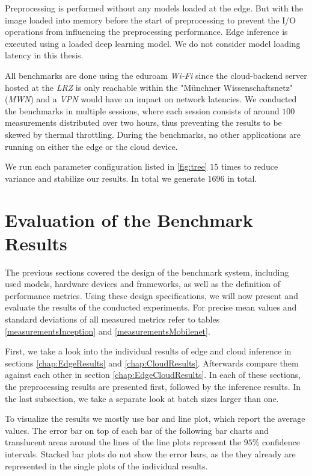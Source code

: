 Preprocessing is performed without any models loaded at the edge. But with the image loaded into memory before the start of preprocessing to prevent the I/O operations from influencing the preprocessing performance.
Edge inference is executed using a loaded deep learning model. 
We do not consider model loading latency in this thesis.

All benchmarks are done using the eduroam \emph{Wi‑Fi} since the cloud-backend server hosted at the \emph{LRZ} is only reachable within the "Münchner Wissenschaftsnetz" (\emph{MWN}) and a \emph{VPN} would have an impact on network latencies.
We conducted the benchmarks in multiple sessions, where each session consists of around  $100$ measurements distributed over two hours, thus preventing the results to be skewed by thermal throttling.
During the benchmarks, no other applications are running on either the edge or the cloud device.

We run each parameter configuration listed in \ref{fig:tree} $15$ times to reduce variance and stabilize our results. In total we generate $1696$ in total.
\section{Evaluation of the Benchmark Results}
\label{chap:Evaluation}
The previous sections covered the design of the benchmark system, including used models, hardware devices and frameworks, as well as the definition of performance metrics. Using these design specifications, we will now present and evaluate the results of the conducted experiments.
For precise mean values and standard deviations of all measured metrics refer to tables \ref{measurementsInception} and \ref{measurementsMobilenet}.

First, we take a look into the individual results of edge and cloud inference in sections \ref{chap:EdgeResults} and \ref{chap:CloudResults}.
Afterwards compare them against each other in section \ref{chap:EdgeCloudResults}. In each of these sections, the preprocessing results are presented first, followed by the inference results.
In the last subsection, we take a separate look at batch sizes larger than one.

To visualize the results we mostly use bar and line plot, which report the average values.
The error bar on top of each bar of the following bar charts and translucent areas around the lines of the line plots represent the $95\%$ confidence intervals.
Stacked bar plots do not show the error bars, as the they already are represented in the single plots of the individual results.

